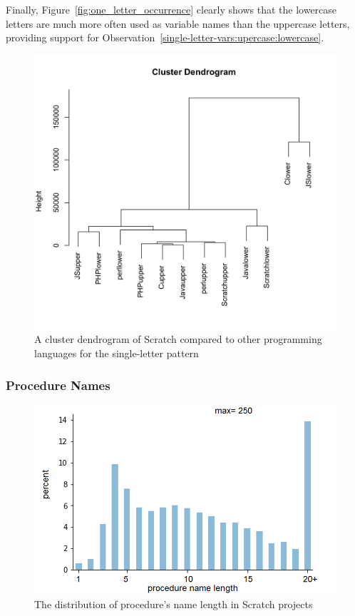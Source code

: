 \documentclass[conference]{IEEEtran}
\begin{document}
Finally, Figure~\ref{fig:one_letter_occurrence} clearly shows that the lowercase letters are much more often used as variable names than the uppercase letters, providing support for Observation~\ref{single-letter-vars:upercase:lowercase}.

\begin{figure}[tb]
	\begin{center}
		\includegraphics[width=\columnwidth]{fig/cluster_single_letter}
		\caption{A cluster dendrogram of Scratch compared to other programming languages for the single-letter pattern}
		\label{fig:similarity_single_letter}
	\end{center}
\end{figure} 


\subsubsection {Procedure Names}
\label{res:proc}
\begin{figure}[tb]
	\begin{center}
		\includegraphics[width=\columnwidth]{fig/project/distribution_proc_name_length}
		\caption{The distribution of procedure's name length in Scratch projects}
		\label{fig:distribution_of_lengths_func}
	\end{center}
\end{figure} 
\end{document}
